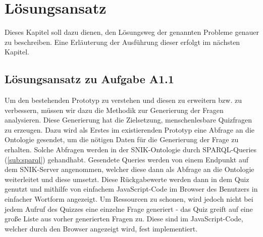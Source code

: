 \documentclass[headsepline,titlepage,ngerman,twoside,12pt]{report}
\newcommand\todo[1]{}%
\begin{document}
\chapter{Lösungsansatz}
\label{ch:Lösungsansatz}
\todo{Der Lösungsansatz ist eine kurze Beschreibung der Arbeitshypothese sowie des Vorgehens zur Lösung der in der Einleitung beschriebenen Probleme.}
Dieses Kapitel soll dazu dienen, den Lösungsweg der genannten Probleme genauer zu beschreiben.
Eine Erläuterung der Ausführung dieser erfolgt im nächsten Kapitel. 

\section{Lösungsansatz zu Aufgabe A1.1}
Um den bestehenden Prototyp zu verstehen und diesen zu erweitern bzw. zu verbessern, müssen wir dazu die Methodik zur Generierung der Fragen analysieren.
Diese Generierung hat die Zielsetzung, menschenlesbare Quizfragen zu erzeugen.
Dazu wird als Erstes im existierenden Prototyp eine Abfrage an die Ontologie gesendet, um die nötigen Daten für die Generierung der Frage zu erhalten.
Solche Abfragen werden in der SNIK-Ontologie durch SPARQL-Queries (\cref{sub:sparql}) gehandhabt. Gesendete Queries werden von einem Endpunkt auf dem SNIK-Server angenommen, welcher diese dann als Abfrage an die Ontologie weiterleitet und diese umsetzt. Diese Rückgabewerte werden dann in dem Quiz genutzt und mithilfe von einfachem JavaScript-Code im Browser des Benutzers in einfacher Wortform angezeigt. Um Ressourcen zu schonen, wird jedoch nicht bei jedem Aufruf des Quizzes eine einzelne Frage generiert - das Quiz greift auf eine große Liste aus vorher generierten Fragen zu.
Diese sind im JavaScript-Code, welcher durch den Browser angezeigt wird, fest implementiert.\\

\end{document}
